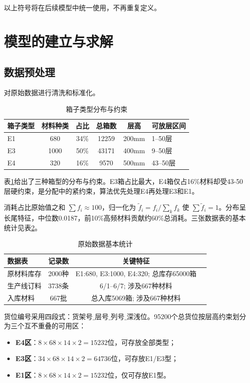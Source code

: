 \documentclass[a4paper]{cumcmthesis}
\newcommand{\headcol}{\rowcolor{tableheadcolor}}
\newcommand{\ftilde}{\tilde{f}}
\begin{document}
以上符号将在后续模型中统一使用，不再重复定义。

\section{模型的建立与求解}

\subsection{数据预处理}

对原始数据进行清洗和标准化。

\begin{table}[htbp]
\centering\small
\caption{箱子类型分布与约束}
\label{tab:box_types}
\begin{tabular}{lccccl}
\toprule
\headcol 箱子类型 & 材料种类 & 占比 & 总箱数 & 层高 & 可放层区间 \\
\midrule
E1 & 680 & 34\% & 12259 & 200mm & 1--50层 \\
E3 & 1000 & 50\% & 43171 & 400mm & 9--50层 \\
E4 & 320 & 16\% & 9570 & 500mm & 43--50层 \\
\bottomrule
\end{tabular}
\end{table}

表\ref{tab:box_types}给出了三种箱型的分布与约束。E3箱占比最大，E4箱仅占16\%材料却受43-50层硬约束，是分配中的紧约束，算法优先处理E4再处理E3和E1。

消耗占比原始值之和 $\sum f_i\approx 100$，归一化为 $\ftilde_i=f_i/\sum_k f_k$ 使 $\sum\ftilde_i=1$。分布呈长尾特征，中位数0.0187，前10\%高频材料贡献约60\%总消耗。三张数据表的基本统计见表\ref{tab:data_summary}。

\begin{table}[htbp]
\centering\small
\caption{原始数据基本统计}
\label{tab:data_summary}
\begin{tabular}{lccc}
\toprule
\headcol 数据表 & 记录数 & 关键特征 \\
\midrule
原材料库存 & 2000种 & E1:680, E3:1000, E4:320; 总库存65000箱 \\
生产线订料 & 3738条 & 6/1--6/7; 涉及667种材料 \\
入库材料 & 667批 & 总入库5069箱; 涉及667种材料 \\
\bottomrule
\end{tabular}
\end{table}

货位编号采用四段式：$\text{货架号}\_\text{层号}\_\text{列号}\_\text{深浅位}$。95200个总货位按层高约束划分为三个互不重叠的可用区：
\begin{itemize}
\item \textbf{E4区}：$8\times 68\times 14\times 2=15232$位，可存放全部类型；
\item \textbf{E3区}：$34\times 68\times 14\times 2=64736$位，可存放E1/E3型；
\item \textbf{E1区}：$8\times 68\times 14\times 2=15232$位，仅可存放E1型。
\end{itemize}
\end{document}
